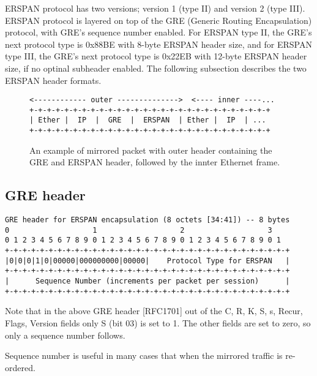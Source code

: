 \documentclass{sigplanconf}
\begin{document}
ERSPAN protocol has two versions; version 1 (type II) and
version 2 (type III). ERSPAN protocol is layered on top of the GRE (Generic Routing
Encapsulation) protocol, with GRE's sequence number enabled.  For ERSPAN type II,
the GRE's next protocol type is 0x88BE with 8-byte ERSPAN header size, and for
ERSPAN type III, the GRE's next protocol type is 0x22EB with 12-byte ERSPAN header
size, if no optinal subheader enabled.
The following subsection describes the two ERSPAN header formats.

\begin{figure}
{\scriptsize
\begin{verbatim}
<------------ outer -------------->  <---- inner ----...
+-+-+-+-+-+-+-+-+-+-+-+-+-+-+-+-+-+-+-+-+-+-+-+-+-+-+-+
| Ether |  IP  |  GRE  |  ERSPAN  | Ether |  IP  | ...   
+-+-+-+-+-+-+-+-+-+-+-+-+-+-+-+-+-+-+-+-+-+-+-+-+-+-+-+
\end{verbatim}
}
\vspace{-1.0em}
\caption{An example of mirrored packet with outer header containing
the GRE and ERSPAN header, followed by the innter Ethernet frame.}
\label{erspanhrd}
\vspace{-1.0em}
\end{figure}

\subsection{GRE header}
{\scriptsize
\begin{verbatim}
GRE header for ERSPAN encapsulation (8 octets [34:41]) -- 8 bytes
0                   1                   2                   3
0 1 2 3 4 5 6 7 8 9 0 1 2 3 4 5 6 7 8 9 0 1 2 3 4 5 6 7 8 9 0 1
+-+-+-+-+-+-+-+-+-+-+-+-+-+-+-+-+-+-+-+-+-+-+-+-+-+-+-+-+-+-+-+-+
|0|0|0|1|0|00000|000000000|00000|    Protocol Type for ERSPAN   |
+-+-+-+-+-+-+-+-+-+-+-+-+-+-+-+-+-+-+-+-+-+-+-+-+-+-+-+-+-+-+-+-+
|      Sequence Number (increments per packet per session)      |
+-+-+-+-+-+-+-+-+-+-+-+-+-+-+-+-+-+-+-+-+-+-+-+-+-+-+-+-+-+-+-+-+
\end{verbatim}
}
Note that in the above GRE header [RFC1701] out of the C, R, K, S,
s, Recur, Flags, Version fields only S (bit 03) is set to 1. The
other fields are set to zero, so only a sequence number follows.

Sequence number is useful in many cases that
when the mirrored traffic is re-ordered.
\end{document}
